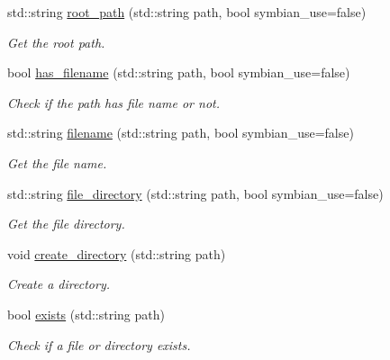 \begin{DoxyCompactItemize}
std\+::string \mbox{\hyperlink{namespaceeka2l1_a688a1ae105b53fe9fbf00d73231f4e73}{root\+\_\+path}} (std\+::string path, bool symbian\+\_\+use=false)
\begin{DoxyCompactList}\small\item\em Get the root path. \end{DoxyCompactList}\item 
bool \mbox{\hyperlink{namespaceeka2l1_a2c45a9774d5cd66fd88e4aa019b05486}{has\+\_\+filename}} (std\+::string path, bool symbian\+\_\+use=false)
\begin{DoxyCompactList}\small\item\em Check if the path has file name or not. \end{DoxyCompactList}\item 
std\+::string \mbox{\hyperlink{namespaceeka2l1_a17ab604e5b9c2849d36eb62e98214378}{filename}} (std\+::string path, bool symbian\+\_\+use=false)
\begin{DoxyCompactList}\small\item\em Get the file name. \end{DoxyCompactList}\item 
\mbox{\label{namespaceeka2l1_a7ae40ba174cb84e79ff0ffa1e2e75713}} 
std\+::string \mbox{\hyperlink{namespaceeka2l1_a7ae40ba174cb84e79ff0ffa1e2e75713}{file\+\_\+directory}} (std\+::string path, bool symbian\+\_\+use=false)
\begin{DoxyCompactList}\small\item\em Get the file directory. \end{DoxyCompactList}\item 
\mbox{\label{namespaceeka2l1_a2e803aeacf7f9a325fd3bee3c1b7975f}} 
void \mbox{\hyperlink{namespaceeka2l1_a2e803aeacf7f9a325fd3bee3c1b7975f}{create\+\_\+directory}} (std\+::string path)
\begin{DoxyCompactList}\small\item\em Create a directory. \end{DoxyCompactList}\item 
\mbox{\label{namespaceeka2l1_a83dd63407e751ca172b510b45e0ca1c1}} 
bool \mbox{\hyperlink{namespaceeka2l1_a83dd63407e751ca172b510b45e0ca1c1}{exists}} (std\+::string path)
\begin{DoxyCompactList}\small\item\em Check if a file or directory exists. \end{DoxyCompactList}\item 

\end{DoxyCompactItemize}
